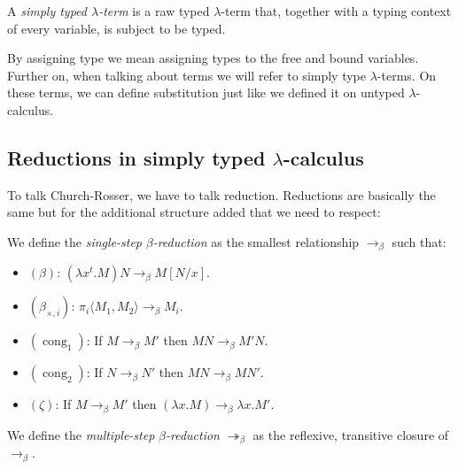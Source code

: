 \begin{definition}
  A \emph{simply typed $\lambda$-term} is a raw typed $\lambda$-term that, together with a typing context of every variable, is subject to be typed.
\end{definition}

By assigning type we mean assigning types to the free and bound variables. Further on, when talking about terms we will refer to simply type $\lambda$-terms. On these terms, we can define substitution just like we defined it on untyped $\lambda$-calculus.


\subsection{Reductions in simply typed $\lambda$-calculus}

To talk Church-Rosser, we have to talk reduction. Reductions are basically the same but for the additional structure added that we need to respect: 

\begin{definition}
  We define the \emph{single-step} $\beta$\emph{-reduction} as the smallest relationship $\to_\beta$ such that:
\begin{itemize}
\item[]$(\beta)$: $ (\lambda x^t.M)N \to_\beta M[N/x]$.\\
\item[]$(\beta_{\times,i})$: $\pi_i\langle M_1,M_2\rangle \to_\beta M_i$.\\
\item[]$(\operatorname{cong}_1)$: If $ M \to_\beta M'$ then $MN \to_\beta M'N$.\\
\item[]$(\operatorname{cong}_2)$: If $ N \to_\beta N'$ then $ MN \to_\beta MN'$.\\
\item[]$(\zeta)$: If $M\to_\beta M'$ then $(\lambda x.M) \to_\beta \lambda x.M'$.\\
\end{itemize}
We define the \emph{multiple-step} $\beta$\emph{-reduction} $\twoheadrightarrow_\beta$ as the reflexive, transitive closure of $\to_\beta$.
\end{definition}

